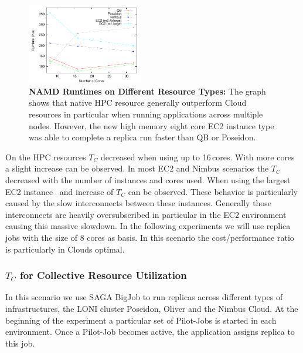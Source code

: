 \documentclass[conference,final]{IEEEtran}
\newcommand{\tc}{$T_{C}$ }
\begin{document}
\begin{figure}[htbp]
    \centering
    \includegraphics[width=0.45\textwidth]{performance/namd_run.pdf}
    \caption{\textbf{NAMD Runtimes on Different Resource Types: } The
      graph shows that native HPC resource generally outperform Cloud
      resources in particular when running applications across
      multiple nodes. However, the new high memory eight core EC2
      instance type was able to complete a replica run faster than QB
      or Poseidon.}
    \label{fig:performance_namd_run}
\end{figure}

On the HPC resources \tc decreased when using up to 16\,cores. With
more cores a slight increase can be observed. In most EC2 and Nimbus
scenarios the \tc decreased with the number of instances and cores
used. When using the largest EC2 instance~\cite{new-ec2} and increase
of \tc can be observed. These behavior is particularly caused by the
slow interconnects between these instances. Generally those
interconnects are heavily oversubscribed in particular in the EC2
environment causing this massive slowdown. In the following
experiments we will use replica jobs with the size of 8 cores as
basis. In this scenario the cost/performance ratio is particularly in
Clouds optimal.

\subsubsection{\tc for Collective Resource Utilization}

In this scenario we use SAGA BigJob to run replicas across
different types of infrastructures, the LONI
cluster Poseidon, Oliver and the Nimbus Cloud. 
At the beginning of the experiment a particular set of
Pilot-Jobs is started in each environment. Once a Pilot-Job becomes
active, the application assigns replica to this job. 
\end{document}
